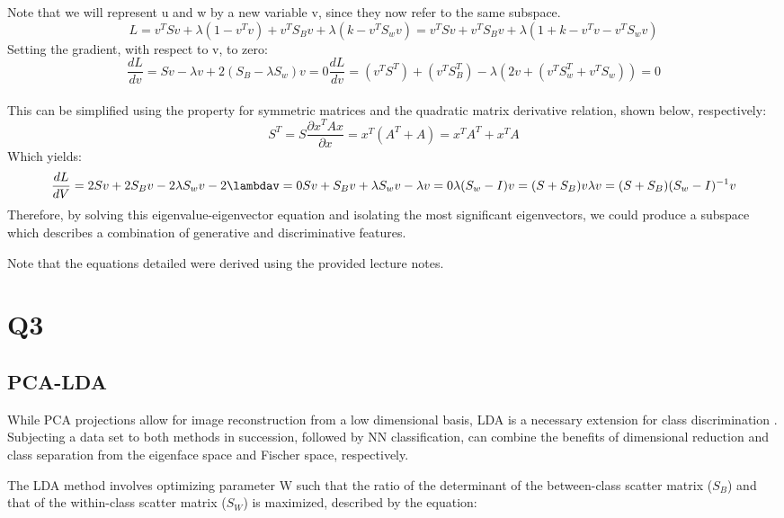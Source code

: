 \documentclass[10pt,twocolumn,letterpaper]{article}
\begin{document}
Note that we will represent u and w by a new variable v, since they now refer to the same subspace. 
\begin{equation}
	L=v^TSv+\lambda (1-v^Tv)+v^TS_Bv+\lambda (k-v^TS_wv)=v^TSv+v^TS_Bv+\lambda (1+k-v^Tv-v^TS_wv)
\end{equation}
Setting the gradient, with respect to v, to zero:
\begin{equation}
	\frac{dL}{dv} = Sv-\lambda v+2(S_B-\lambda S_w)v=0
	\frac{dL}{dv}=(v^TS^T)+(v^TS^T_B)-\lambda (2v+(v^TS^T_w+v^TS_w))=0
\end{equation}
\\This can be simplified using the property for symmetric matrices and the quadratic matrix derivative relation, shown below, respectively:
\begin{equation}
	S^T=S
	\frac{\partial x^TAx}{\partial x} = x^T(A^T+A) = x^TA^T+x^TA
\end{equation}
Which yields:
\begin{equation}
	\frac{dL}{dV} =2Sv+2S_Bv-2\lambda S_wv-2\lambdav=0
	Sv+S_Bv+\lambda S_wv-\lambda v=0
	\lambda (S_w-I)v=(S+S_B)v
	\lambda v=(S+S_B)(S_w-I)^{-1}v
\end{equation}
Therefore, by solving this eigenvalue-eigenvector equation and isolating the most significant eigenvectors, we could produce a subspace which describes a combination of generative and discriminative features. 

Note that the equations detailed were derived using the provided lecture notes. 


\section{Q3}

\subsection{PCA-LDA}
While PCA projections allow for image reconstruction from a low dimensional basis, LDA is a necessary extension for class discrimination . Subjecting a data set to both methods in succession, followed by NN classification, can combine the benefits of dimensional reduction and class separation from the eigenface space and Fischer space, respectively. 

The LDA method involves optimizing parameter W such that the ratio of the determinant of the between-class scatter matrix ($S_B$) and that of the within-class scatter matrix ($S_W$) is maximized, described by the equation:
\end{document}
